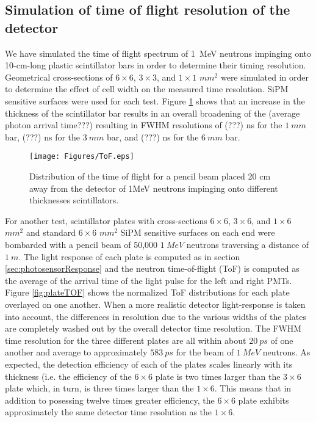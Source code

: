 \subsection{Simulation of time of flight resolution of the detector}

We have simulated the time of flight spectrum of 1~MeV neutrons impinging onto 10-cm-long plastic scintillator bars in order to determine their timing resolution. Geometrical cross-sections of $6 \times 6$, $3 \times 3$, and $1 \times 1$ $mm^{2}$ were simulated in order to determine the effect of cell width on the measured time resolution. SiPM sensitive surfaces were used for each test. Figure \ref{fig:ToF} shows that an increase in the thickness of the scintillator bar results in an overall broadening of the (average photon arrival time???) resulting in FWHM resolutions of (???) ns for the $1~mm$ bar, (???) ns for the $3~mm$ bar, and (???) ns for the $6~mm$ bar.

\begin{figure}[htb]
\centering
\texttt{[image: Figures/ToF.eps]}
\caption{Distribution of the time of flight for a pencil beam  placed 20 cm away from the detector of 1MeV  neutrons impinging onto different thicknesses scintillators.}
\label{fig:ToF}
\end{figure}

For another test, scintillator plates with cross-sections $6 \times 6$, $3 \times 6$, and $1 \times 6$ $mm^{2}$ and standard $6 \times 6$ $mm^{2}$ SiPM sensitive surfaces on each end were bombarded with a pencil beam of 50,000 $1~MeV$ neutrons traversing a distance of $1~m$. The light response of each plate is computed as in section \ref{sec:photosensorResponse} and the neutron time-of-flight (ToF) is computed as the average of the arrival time of the light pulse for the left and right PMTs. Figure \ref{fig:plateTOF} shows the normalized ToF distributions for each plate overlayed on one another. When a more realistic detector light-response is taken into account, the differences in resolution due to the various widths of the plates are completely washed out by the overall detector time resolution. The FWHM time resolution for the three different plates are all within about $20~ps$ of one another and average to approximately $583~ps$ for the beam of $1~MeV$ neutrons. As expected, the detection efficiency of each of the plates scales linearly with its thickness (i.e. the efficiency of the $6 \times 6$ plate is two times larger than the $3 \times 6$ plate which, in turn, is three times larger than the $1 \times 6$. This means that in addition to posessing twelve times greater efficiency, the $6 \times 6$ plate exhibits approximately the same detector time resolution as the $1 \times 6$.

